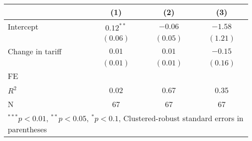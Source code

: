 
\begin{tabular}{l c c c }
\hline
 & (1) & (2) & (3) \\
\hline
Intercept & $0.12^{**}$ & $-0.06$  & $-1.58$  \\
            & $(0.06)$    & $(0.05)$ & $(1.21)$ \\
Change in tariff     & $0.01$      & $0.01$   & $-0.15$  \\
            & $(0.01)$    & $(0.01)$ & $(0.16)$ \\
\hline
FE          &                &                &                \\ 
\hline
$R^2$       & 0.02        & 0.67     & 0.35     \\
N           & 67          & 67       & 67       \\
\hline
\multicolumn{4}{l}{\scriptsize{$^{***}p<0.01$, $^{**}p<0.05$, $^*p<0.1$, Clustered-robust standard errors in parentheses}}
\end{tabular}

